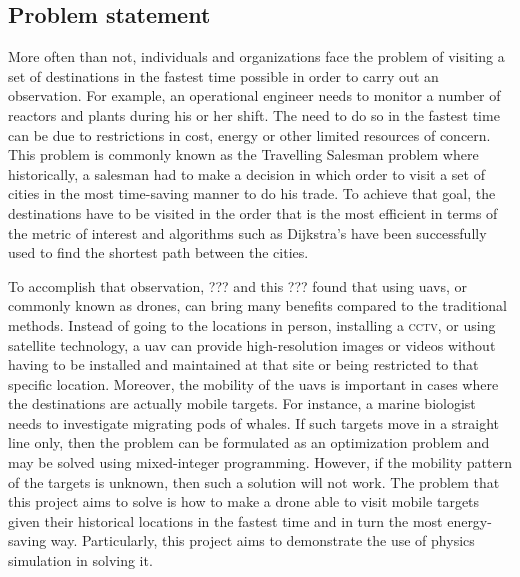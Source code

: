 \documentclass[../main.tex]{subfiles}
\begin{document}
\subsection{Problem statement}

More often than not, individuals and organizations face the problem
of visiting a set of destinations in the fastest time possible
in order to carry out an observation.
For example, an operational engineer needs to monitor
a number of reactors and plants during his or her shift.
The need to do so in the fastest time can be due to restrictions in
cost, energy or other limited resources of concern.
This problem is commonly known as the Travelling Salesman problem
where historically, a salesman had to make a decision in which order
to visit a set of cities in the most time-saving manner to do his trade.
To achieve that goal, the destinations have to be visited in the order
that is the most efficient in terms of the metric of interest
and algorithms such as Dijkstra's have been successfully used 
to find the shortest path between the cities.

To accomplish that observation, ??? and this ???
found that using \glspl{uav}, or commonly known as drones,
can bring many benefits 
compared to the traditional methods.
Instead of going to the locations in person, installing a \textsc{cctv},
or using satellite technology, a \gls{uav} can provide
high-resolution images or videos without 
having to be installed and maintained at that site
or being restricted to that specific location.
Moreover, the mobility of the \glspl{uav} is important
in cases where the destinations are actually mobile targets.
For instance, a marine biologist needs to investigate 
migrating pods of whales.
If such targets move in a straight line only,
then the problem can be formulated as an optimization problem
and may be solved using mixed-integer programming.
However, if the mobility pattern of the targets is unknown,
then such a solution will not work.
The problem that this project aims to solve is 
how to make a drone able to visit mobile targets 
given their historical locations in the fastest time
and in turn the most energy-saving way. 
Particularly, this project aims to demonstrate the 
use of physics simulation in solving it. 
\end{document}
